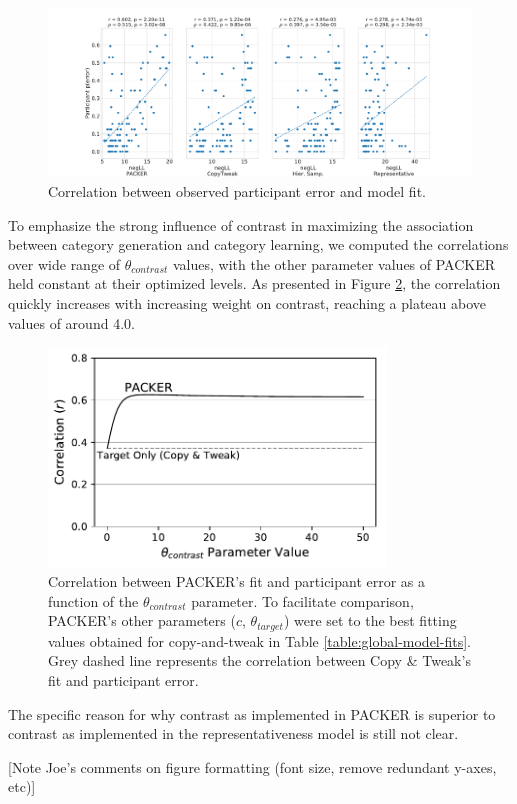 \begin{figure}
    \begin{center}
    \includegraphics[width=\textwidth]{figs/perror_corr.pdf}
    \caption{Correlation between observed participant error and model fit.}
    \label{fig:perror_corr}
    \end{center}
\end{figure}

To emphasize the strong influence of contrast in maximizing the association
between category generation and category learning, we computed the correlations
over wide range of $\theta_{contrast}$ values, with the other parameter values of
PACKER held constant at their optimized levels. As presented in Figure
\ref{fig:packer-corr}, the correlation quickly increases with increasing weight
on contrast, reaching a plateau above values of around 4.0.

\begin{figure}
    \begin{center}
    \includegraphics[width=0.8\textwidth]{figs/packer-corr.pdf}
    \caption{Correlation between PACKER's fit and participant error as a
      function of the $\theta_{contrast}$ parameter. To facilitate comparison,
      PACKER's other parameters ($c$, $\theta_{target}$) were set to the best
      fitting values obtained for copy-and-tweak in Table
      \ref{table:global-model-fits}. Grey dashed line represents the correlation
      between Copy \& Tweak's fit and participant error.}
    \label{fig:packer-corr}
    \end{center}
\end{figure}


The specific reason for why contrast as implemented in PACKER is superior to
contrast as implemented in the representativeness model is still not clear.

[Note Joe's comments on figure formatting (font size, remove redundant y-axes,
etc)]













